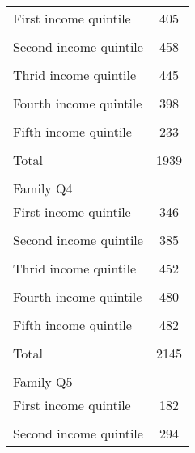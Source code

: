 {\begin{tabular}{l*{1}{c}}
First income quintile&         405         \\
                    &                     \\
\addlinespace
Second income quintile&         458         \\
                    &                     \\
\addlinespace
Thrid income quintile&         445         \\
                    &                     \\
\addlinespace
Fourth income quintile&         398         \\
                    &                     \\
\addlinespace
Fifth income quintile&         233         \\
                    &                     \\
\addlinespace
Total               &        1939         \\
                    &                     \\
\midrule
Family Q4           &                     \\
First income quintile&         346         \\
                    &                     \\
\addlinespace
Second income quintile&         385         \\
                    &                     \\
\addlinespace
Thrid income quintile&         452         \\
                    &                     \\
\addlinespace
Fourth income quintile&         480         \\
                    &                     \\
\addlinespace
Fifth income quintile&         482         \\
                    &                     \\
\addlinespace
Total               &        2145         \\
                    &                     \\
\midrule
Family Q5           &                     \\
First income quintile&         182         \\
                    &                     \\
\addlinespace
Second income quintile&         294         \\

\end{tabular}}
